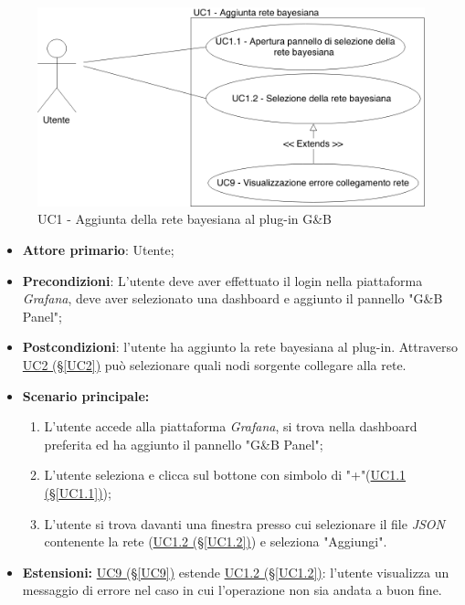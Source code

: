 \begin{figure}[H]
	\begin{center}
		\includegraphics[scale=0.4]{./images/UC1.png}
		 \caption{UC1 - Aggiunta della rete bayesiana al plug-in G\&B}	
	\end{center}
\end{figure}
\begin{itemize}
	\item \textbf{Attore primario}: Utente;
	\item \textbf{Precondizioni}: L'utente deve aver effettuato il login nella piattaforma \textit{Grafana}, deve aver selezionato una dashboard e aggiunto il pannello "G\&B Panel";
	\item \textbf{Postcondizioni}: l'utente ha aggiunto la rete bayesiana al plug-in. Attraverso \hyperref[UC2]{UC2 (§\ref*{UC2})} può selezionare quali nodi sorgente collegare alla rete.
	\item \textbf{Scenario principale:}
	\begin{enumerate}
		\item L'utente accede alla piattaforma \textit{Grafana}, si trova nella dashboard preferita ed ha aggiunto il pannello "G\&B Panel";
		\item L'utente seleziona e clicca sul bottone con simbolo di "+"(\hyperref[UC1.1]{UC1.1 (§\ref*{UC1.1})});
		\item L'utente si trova davanti una finestra presso cui selezionare il file \textit{JSON} contenente la rete (\hyperref[UC1.2]{UC1.2 (§\ref*{UC1.2})}) e seleziona "Aggiungi".
	\end{enumerate}
	\item \textbf{Estensioni:} \hyperref[UC9]{UC9 (§\ref*{UC9})} estende \hyperref[UC1.2]{UC1.2 (§\ref*{UC1.2})}: l'utente visualizza un messaggio di errore nel caso in cui l'operazione non sia andata a buon fine.
\end{itemize}


